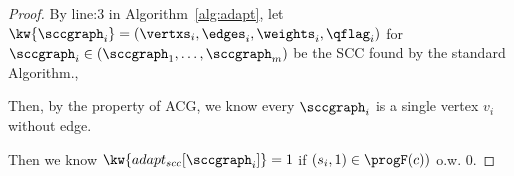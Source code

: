 \begin{proof}
  By line:3 in Algorithm~\ref{alg:adapt}, 
  let $\kw{\sccgraph_i} = (\vertxs_i, \edges_i, \weights_i, \qflag_i)$ for $\sccgraph_i \in (\sccgraph_1, \ldots, \sccgraph_m)$
  be the SCC found by the standard Algorithm.,

  Then, by the property of ACG, we know every $\sccgraph_i$ is a single vertex $v_i$ without edge.
  
  Then we know $\kw{adapt_{scc}[\sccgraph_i]} = 1$ if $(s_i, 1) \in \progF(c))$ o.w. $0$.
  

\end{proof}
